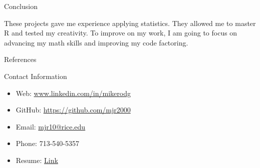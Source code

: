 \documentclass[final]{beamer}
\newlength{\onecolwid}
\begin{document}
\begin{frame}[t]
\begin{columns}[t]
\begin{column}{\onecolwid}
\begin{alertblock}{Conclusion}

These projects gave me experience applying statistics. They allowed me 
to master R and tested my creativity. To improve on my work, I am going to focus on advancing my math skills and improving my code factoring.

\end{alertblock}



\begin{block}{References}

\nocite{*} %
\small{
\vspace{0.75in}}

\end{block}





\begin{alertblock}{Contact Information}

\begin{itemize}
\item Web: \href{https://www.linkedin.com/in/mikerodg}
{www.linkedin.com/in/mikerodg}
\item GitHub: \href{https://github.com/mjr2000}{https://github.com/mjr2000}
\item Email: \href{mailto:mjr10@rice.edu}
{mjr10@rice.edu}
\item Phone: 713-540-5357
\item Resume: \href{https://www.dropbox.com/s/nncfupjevd9gki1/RESUME.pdf?dl=0}{Link}
\end{itemize}


\end{alertblock}
\end{column}
\end{columns}
\end{frame}
\end{document}
